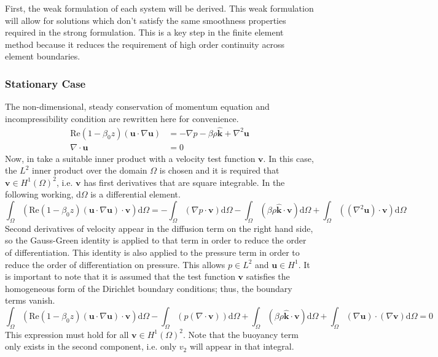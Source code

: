 \documentclass[12pt]{article}
\begin{document}
First, the weak formulation of each system will be derived. This weak formulation will allow for solutions which don't satisfy the same smoothness properties required in the strong formulation. This is a key step in the finite element method because it reduces the requirement of high order continuity across element boundaries.

\subsubsection{Stationary Case}

The non-dimensional, steady conservation of momentum equation  and incompressibility condition  are rewritten here for convenience.
\begin{align}
\label{eq:a}
\text{Re}(1-\beta_0z)(\mathbf{u}\cdot\nabla\mathbf{u})&=-\nabla p-\beta\rho\mathbf{\hat{k}}+\nabla^2\mathbf{u}\\
\label{eq:b}
\nabla\cdot\mathbf{u}&=0
\end{align}
Now, in  take a suitable inner product with a velocity test function $\mathbf{v}$. In this case, the $L^2$ inner product over the domain $\Omega$ is chosen and it is required that $\mathbf{v}\in H^1(\Omega)^2$, i.e. $\mathbf{v}$ has first derivatives that are square integrable. In the following working, d$\Omega$ is a differential element.
\begin{equation}
\int_\Omega(\text{Re}(1-\beta_0z)(\mathbf{u}\cdot\nabla\mathbf{u})\cdot\mathbf{v})\text{d}\Omega=-\int_\Omega(\nabla p\cdot\mathbf{v})\text{d}\Omega-\int_\Omega(\beta\rho\mathbf{\hat{k}}\cdot\mathbf{v})\text{d}\Omega+\int_\Omega((\nabla^2\mathbf{u})\cdot\mathbf{v})\text{d}\Omega
\end{equation}
Second derivatives of velocity appear in the diffusion term on the right hand side, so the Gauss-Green identity is applied to that term in order to reduce the order of differentiation.  This identity is also applied to the pressure term in order to reduce the order of differentiation on pressure. This allows $p\in L^2$ and $\mathbf{u}\in H^1$. It is important to note that it is assumed that the test function $\mathbf{v}$ satisfies the homogeneous form of the Dirichlet boundary conditions; thus, the boundary terms vanish.
\begin{equation}
\label{eq:weakmomentum}
\int_\Omega(\text{Re}(1-\beta_0z)(\mathbf{u}\cdot\nabla\mathbf{u})\cdot\mathbf{v})\text{d}\Omega-\int_\Omega(p(\nabla\cdot\mathbf{v}))\text{d}\Omega+\int_\Omega(\beta\rho\mathbf{\hat{k}}\cdot\mathbf{v})\text{d}\Omega+\int_\Omega(\nabla\mathbf{u})\cdot(\nabla\mathbf{v})\text{d}\Omega=0
\end{equation}
This expression must hold for all $\mathbf{v}\in H^1(\Omega)^2$. Note that the buoyancy term only exists in the second component, i.e. only $v_2$ will appear in that integral.
\end{document}
